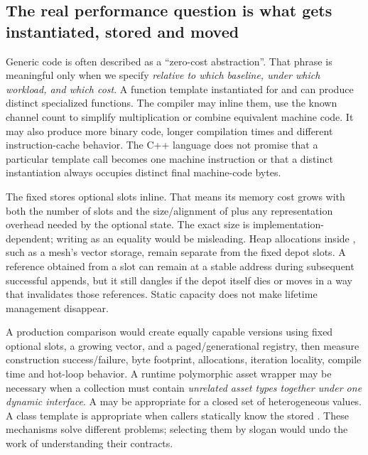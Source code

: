 \subsection{The real performance question is what gets instantiated, stored and moved}\label{01-foundations-i-ch005-the-real-performance-question-is-what-gets-instantiated-stored-and-moved}

\hypertarget{01-foundations-i-ch005-the-real-performance-question-is-what-gets-instantiated-stored-and-moved}{}

Generic code is often described as a ``zero-cost abstraction''. That phrase is meaningful only when we specify \emph{relative to which baseline, under which workload, and which cost}. A function template instantiated for  and  can produce distinct specialized functions. The compiler may inline them, use the known channel count to simplify multiplication or combine equivalent machine code. It may also produce more binary code, longer compilation times and different instruction-cache behavior. The C++ language does not promise that a particular template call becomes one machine instruction or that a distinct instantiation always occupies distinct final machine-code bytes.

The fixed  stores  optional slots inline. That means its memory cost grows with both the number of slots and the size/alignment of  plus any representation overhead needed by the optional state. The exact size is implementation-dependent; writing  as an equality would be misleading. Heap allocations inside , such as a mesh's vector storage, remain separate from the fixed depot slots. A reference obtained from a slot can remain at a stable address during subsequent successful appends, but it still dangles if the depot itself dies or moves in a way that invalidates those references. Static capacity does not make lifetime management disappear.

A production comparison would create equally capable versions using fixed optional slots, a growing vector, and a paged/generational registry, then measure construction success/failure, byte footprint, allocations, iteration locality, compile time and hot-loop behavior. A runtime polymorphic asset wrapper may be necessary when a collection must contain \emph{unrelated asset types together under one dynamic interface}. A  may be appropriate for a closed set of heterogeneous values. A class template is appropriate when callers statically know the stored . These mechanisms solve different problems; selecting them by slogan would undo the work of understanding their contracts.

